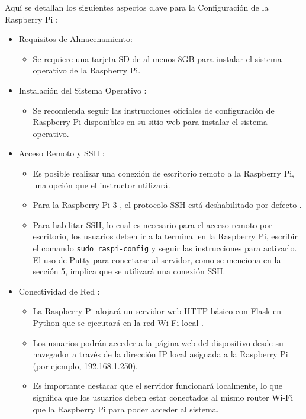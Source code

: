 \documentclass{report}
\begin{document}
Aquí se detallan los siguientes aspectos clave para la  Configuración de la Raspberry Pi :
\begin{itemize}
    \item Requisitos de Almacenamiento:
    \begin{itemize}
        \item Se requiere una  tarjeta SD de al menos 8GB  para instalar el sistema operativo de la Raspberry Pi.
    \end{itemize}

    \item Instalación del Sistema Operativo :
    \begin{itemize}
        \item Se recomienda seguir las  instrucciones oficiales de configuración de Raspberry Pi  disponibles en su sitio web para instalar el sistema 
        operativo.
    \end{itemize}

    \item Acceso Remoto y SSH :
    \begin{itemize}
        \item Es posible realizar una  conexión de escritorio remoto  a la Raspberry Pi, una opción que el instructor utilizará.
        \item Para la  Raspberry Pi 3 , el protocolo  SSH está deshabilitado por defecto .
        \item Para habilitar SSH, lo cual es necesario para el acceso remoto por escritorio, los usuarios deben ir a la terminal en la Raspberry Pi, 
        escribir el comando \verb|sudo raspi-config| y seguir las instrucciones para activarlo. El uso de  Putty  para conectarse al servidor, como se 
        menciona en la sección 5, implica que se utilizará una conexión SSH.
    \end{itemize}
    
    \item Conectividad de Red :
    \begin{itemize}
        \item La Raspberry Pi alojará un  servidor web HTTP básico con Flask en Python  que se ejecutará en la  red Wi-Fi local .
        \item Los usuarios podrán acceder a la página web del dispositivo desde su navegador a través de la  dirección IP local  asignada a la 
        Raspberry Pi (por ejemplo, 192.168.1.250).
        \item Es importante destacar que el servidor funcionará localmente, lo que significa que los usuarios deben estar  conectados al mismo router 
        Wi-Fi  que la Raspberry Pi para poder acceder al sistema.
    \end{itemize}


\end{itemize}
\end{document}
